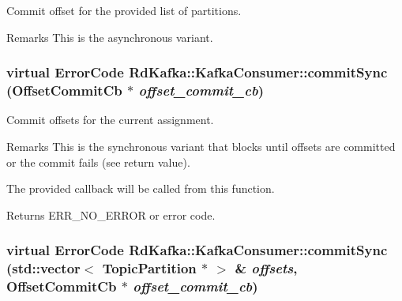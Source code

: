 Commit offset for the provided list of partitions. \begin{DoxyRemark}{Remarks}
This is the asynchronous variant. 
\end{DoxyRemark}
\hypertarget{classRdKafka_1_1KafkaConsumer_a6791befdd7d705be26e5ed69cf219376}{
\subsubsection[{commitSync}]{\setlength{\rightskip}{0pt plus 5cm}virtual ErrorCode RdKafka::KafkaConsumer::commitSync ({\bf OffsetCommitCb} $\ast$ {\em offset\_\-commit\_\-cb})}}
\label{classRdKafka_1_1KafkaConsumer_a6791befdd7d705be26e5ed69cf219376}


Commit offsets for the current assignment. \begin{DoxyRemark}{Remarks}
This is the synchronous variant that blocks until offsets are committed or the commit fails (see return value).

The provided callback will be called from this function.
\end{DoxyRemark}
\begin{DoxyReturn}{Returns}
ERR\_\-NO\_\-ERROR or error code. 
\end{DoxyReturn}
\hypertarget{classRdKafka_1_1KafkaConsumer_aaa28c44fe9505f48644f06f49403fcc3}{
\subsubsection[{commitSync}]{\setlength{\rightskip}{0pt plus 5cm}virtual ErrorCode RdKafka::KafkaConsumer::commitSync (std::vector$<$ {\bf TopicPartition} $\ast$ $>$ \& {\em offsets}, \/  {\bf OffsetCommitCb} $\ast$ {\em offset\_\-commit\_\-cb})}}
\label{classRdKafka_1_1KafkaConsumer_aaa28c44fe9505f48644f06f49403fcc3}



